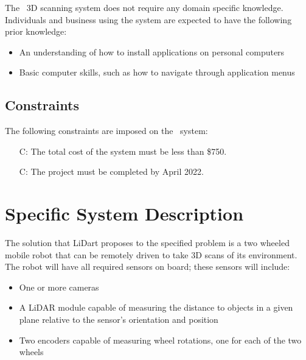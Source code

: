 \documentclass[12pt]{article}
\newcounter{constnum} %
\begin{document}
The \progname\ 3D scanning system does not require any domain specific knowledge. Individuals and business using the system are expected to have the following prior knowledge:   
  
\begin{itemize}
\item An understanding of how to install applications on personal computers
\item Basic computer skills, such as how to navigate through application menus
\end{itemize}

\subsection{Constraints}


The following constraints are imposed on the \progname\ system:
\noindent \begin{itemize}
\item[C\refstepcounter{constnum}\theconstnum :] The total cost of the system must be less than \$750.
\item[C\refstepcounter{constnum}\theconstnum :] The project must be completed by April 2022.
\end{itemize}

\section{Specific System Description} 
\label{sec_SpecificDesc}

The solution that LiDart proposes to the specified problem is a two wheeled
mobile robot that can be remotely driven to take 3D scans of its environment.
The robot will have all required sensors on board; these sensors will include:

\begin{itemize}
\item One or more cameras
\item A LiDAR module capable of measuring the distance to objects in a given plane relative to the sensor's orientation and position
\item Two encoders capable of measuring wheel rotations, one for each of the two wheels
\end{itemize}
\end{document}
